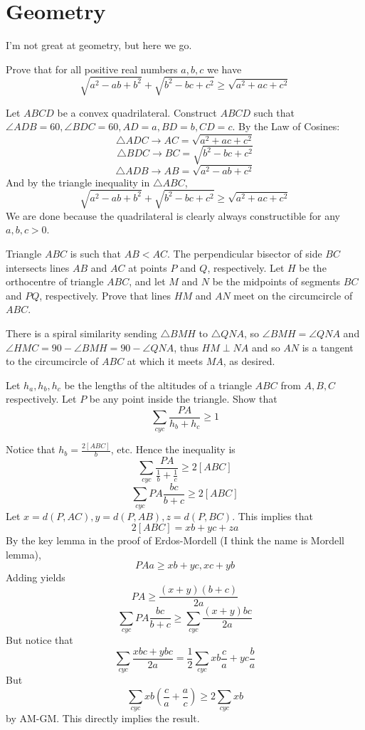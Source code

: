 \documentclass[11pt]{scrartcl}
\begin{document}
\section{Geometry}
I'm not great at geometry, but here we go.
\begin{example}
  Prove that for all positive real numbers $a,b,c$ we have
  $$\sqrt{a^2-ab+b^2}+\sqrt{b^2-bc+c^2}\ge\sqrt{a^2+ac+c^2}$$
\end{example}
\begin{soln}
  Let $ABCD$ be a convex quadrilateral. Construct $ABCD$ such that $\angle ADB=60, \angle BDC=60, AD=a, BD=b, CD=c$. By the Law of Cosines:
  $$\triangle ADC\to AC=\sqrt{a^2+ac+c^2}$$
  $$\triangle BDC\to BC=\sqrt{b^2-bc+c^2}$$
  $$\triangle ADB\to AB=\sqrt{a^2-ab+c^2}$$
  And by the triangle inequality in $\triangle ABC$,
  $$\sqrt{a^2-ab+b^2}+\sqrt{b^2-bc+c^2}\ge\sqrt{a^2+ac+c^2}$$
  We are done because the quadrilateral is clearly always constructible for any $a,b,c>0$.
\end{soln}
\begin{example}
  [JBMO 2019]
  Triangle $ABC$ is such that $AB < AC$. The perpendicular bisector of side $BC$ intersects lines $AB$ and $AC$ at points $P$ and $Q$, respectively. Let $H$ be the orthocentre of triangle $ABC$, and let $M$ and $N$ be the midpoints of segments $BC$ and $PQ$, respectively. Prove that lines $HM$ and $AN$ meet on the circumcircle of $ABC$.

\end{example}
\begin{soln}
  There is a spiral similarity sending $\triangle BMH$ to $\triangle QNA$, so $\angle BMH=\angle QNA$ and $\angle HMC=90-\angle BMH=90-\angle QNA$, thus $HM\perp NA$ and so $AN$ is a tangent to the circumcircle of $ABC$ at which it meets $MA$, as desired.
\end{soln}
\begin{example}
  Let $h_a, h_b, h_c$ be the lengths of the altitudes of a triangle $ABC$ from
  $A,B,C$ respectively. Let $P$ be any point inside the triangle. Show that
  $$\sum_{cyc}\frac{PA}{h_b+h_c}\ge 1$$
\end{example}
\begin{soln}
  Notice that $h_b=\frac{2[ABC]}{b}$, etc. Hence the inequality is
  $$\sum_{cyc}\frac{PA}{\frac{1}{b}+\frac{1}{c}}\ge 2[ABC]$$
  $$\sum_{cyc}PA\frac{bc}{b+c}\ge 2[ABC]$$
  Let $x=d(P, AC), y=d(P, AB), z=d(P, BC)$. This implies that
  $$2[ABC]=xb+yc+za$$
  By the key lemma in the proof of Erdos-Mordell (I think the name is Mordell lemma),
  $$PAa\ge xb+yc, xc+yb$$
  Adding yields
  $$PA\ge \frac{(x+y)(b+c)}{2a}$$
  $$\sum_{cyc}PA\frac{bc}{b+c}\ge \sum_{cyc}\frac{(x+y)bc}{2a}$$
  But notice that
  $$\sum_{cyc}\frac{xbc+ybc}{2a}=\frac{1}{2}\sum_{cyc}xb\frac{c}{a}+yc\frac{b}{a}$$
  But
  $$\sum_{cyc}xb\left(\frac{c}{a}+\frac{a}{c}\right)\ge 2\sum_{cyc}xb$$
  by AM-GM. This directly implies the result.
\end{soln}
\end{document}
